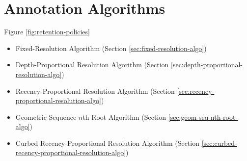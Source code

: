 \section{Annotation Algorithms} \label{sec:annotation}



Figure \ref{fig:retention-policies}

\begin{itemize}
\item Fixed-Resolution Algorithm (Section \ref{sec:fixed-resolution-algo})
\item Depth-Proportional Resolution Algorithm (Section \ref{sec:depth-proportional-resolution-algo})
\item Recency-Proportional Resolution Algorithm (Section \ref{sec:recency-proportional-resolution-algo})
\item Geometric Sequence $n$th Root Algorithm (Section \ref{sec:geom-seq-nth-root-algo})
\item Curbed Recency-Proportional Resolution Algorithm (Section \ref{sec:curbed-recency-proportional-resolution-algo})
\end{itemize}










